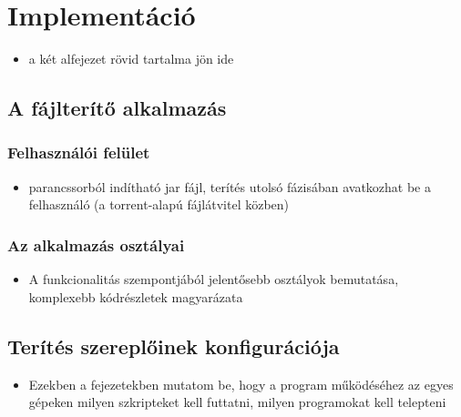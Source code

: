 \chapter{Implementáció}
\begin{itemize}
  \item a két alfejezet rövid tartalma jön ide
\end{itemize}

\section{A fájlterítő alkalmazás}

%
\subsection{Felhasználói felület}
%
\begin{itemize}
  \item parancssorból indítható jar fájl, terítés utolsó fázisában avatkozhat be a felhasználó (a torrent-alapú fájlátvitel közben)
\end{itemize}

%
\subsection{Az alkalmazás osztályai}
%

\begin{itemize}
  \item A funkcionalitás szempontjából jelentősebb osztályok bemutatása, komplexebb kódrészletek magyarázata
\end{itemize}

\section{Terítés szereplőinek konfigurációja}

\begin{itemize}
  \item Ezekben a fejezetekben mutatom be, hogy a program működéséhez az egyes gépeken milyen szkripteket kell futtatni, milyen programokat kell telepteni
\end{itemize}


